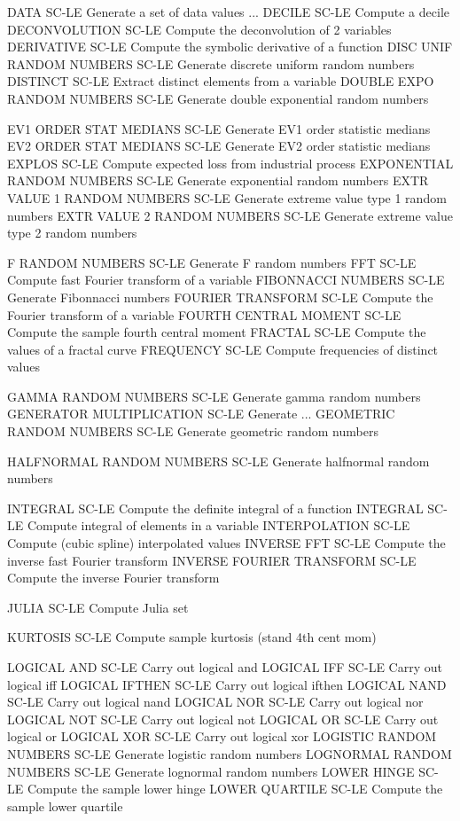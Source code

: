 DATA                        SC-LE Generate a set of data values
... DECILE                  SC-LE Compute a decile
DECONVOLUTION               SC-LE Compute the deconvolution of 2 variables
DERIVATIVE                  SC-LE Compute the symbolic derivative of a function
DISC UNIF RANDOM NUMBERS    SC-LE Generate discrete uniform random numbers
DISTINCT                    SC-LE Extract distinct elements from a variable
DOUBLE EXPO RANDOM NUMBERS  SC-LE Generate double exponential random numbers

EV1 ORDER STAT MEDIANS      SC-LE Generate EV1 order statistic medians
EV2 ORDER STAT MEDIANS      SC-LE Generate EV2 order statistic medians
EXPLOS                      SC-LE Compute expected loss from industrial process
EXPONENTIAL RANDOM NUMBERS  SC-LE Generate exponential random numbers
EXTR VALUE 1 RANDOM NUMBERS SC-LE Generate extreme value type 1 random numbers
EXTR VALUE 2 RANDOM NUMBERS SC-LE Generate extreme value type 2 random numbers

F RANDOM NUMBERS            SC-LE Generate F random numbers
FFT                         SC-LE Compute fast Fourier transform of a variable
FIBONNACCI NUMBERS          SC-LE Generate Fibonnacci numbers
FOURIER TRANSFORM           SC-LE Compute the Fourier transform of a variable
FOURTH CENTRAL MOMENT       SC-LE Compute the sample fourth central moment
FRACTAL                     SC-LE Compute the values of a fractal curve
FREQUENCY                   SC-LE Compute frequencies of distinct values

GAMMA RANDOM NUMBERS        SC-LE Generate gamma random numbers
GENERATOR MULTIPLICATION    SC-LE Generate ...
GEOMETRIC RANDOM NUMBERS    SC-LE Generate geometric random numbers

HALFNORMAL RANDOM NUMBERS   SC-LE Generate halfnormal random numbers

INTEGRAL                    SC-LE Compute the definite integral of a function
INTEGRAL                    SC-LE Compute integral of elements in a variable
INTERPOLATION               SC-LE Compute (cubic spline) interpolated values
INVERSE FFT                 SC-LE Compute the inverse fast Fourier transform
INVERSE FOURIER TRANSFORM   SC-LE Compute the inverse Fourier transform

JULIA                       SC-LE Compute Julia set

KURTOSIS                    SC-LE Compute sample kurtosis (stand 4th cent mom)

LOGICAL AND                 SC-LE Carry out logical and
LOGICAL IFF                 SC-LE Carry out logical iff
LOGICAL IFTHEN              SC-LE Carry out logical ifthen
LOGICAL NAND                SC-LE Carry out logical nand
LOGICAL NOR                 SC-LE Carry out logical nor
LOGICAL NOT                 SC-LE Carry out logical not
LOGICAL OR                  SC-LE Carry out logical or
LOGICAL XOR                 SC-LE Carry out logical xor
LOGISTIC RANDOM NUMBERS     SC-LE Generate logistic random numbers
LOGNORMAL RANDOM NUMBERS    SC-LE Generate lognormal random numbers
LOWER HINGE                 SC-LE Compute the sample lower hinge
LOWER QUARTILE              SC-LE Compute the sample lower quartile

